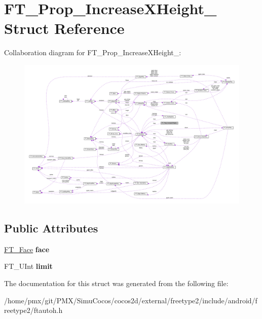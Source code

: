 \hypertarget{structFT__Prop__IncreaseXHeight__}{}\section{F\+T\+\_\+\+Prop\+\_\+\+Increase\+X\+Height\+\_\+ Struct Reference}
\label{structFT__Prop__IncreaseXHeight__}


Collaboration diagram for F\+T\+\_\+\+Prop\+\_\+\+Increase\+X\+Height\+\_\+\+:
\nopagebreak
\begin{figure}[H]
\begin{center}
\leavevmode
\includegraphics[width=350pt]{structFT__Prop__IncreaseXHeight____coll__graph}
\end{center}
\end{figure}
\subsection*{Public Attributes}
\begin{DoxyCompactItemize}
\item 
\mbox{\label{structFT__Prop__IncreaseXHeight___ae761b2b7e3e086b3d672f16f5cc48643}} 
\hyperlink{structFT__FaceRec__}{F\+T\+\_\+\+Face} {\bfseries face}
\item 
\mbox{\label{structFT__Prop__IncreaseXHeight___ae276b4241881f9e8ea57fd3a9e9c0d8a}} 
F\+T\+\_\+\+U\+Int {\bfseries limit}
\end{DoxyCompactItemize}


The documentation for this struct was generated from the following file\+:\begin{DoxyCompactItemize}
\item 
/home/pmx/git/\+P\+M\+X/\+Simu\+Cocos/cocos2d/external/freetype2/include/android/freetype2/ftautoh.\+h\end{DoxyCompactItemize}
